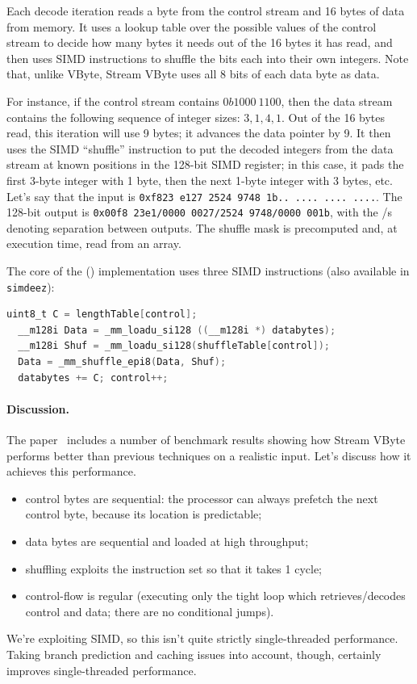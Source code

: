 Each decode iteration reads a byte from the control stream and 16 bytes of data from memory.
It uses a lookup table over the possible values of the control stream to decide how many
bytes it needs out of the 16 bytes it has read, and then uses SIMD instructions to shuffle
the bits each into their own integers. Note that, unlike VByte, Stream VByte uses all 8 bits
of each data byte as data.

For instance, if the control stream contains $0b1000~1100$, then the data stream
contains the following sequence of integer sizes: $3, 1, 4, 1$. Out of the 16 bytes read,
this iteration will use 9 bytes; it advances the data pointer by 9. It then uses the SIMD
``shuffle'' instruction to put the decoded integers from the data stream at known positions in the
128-bit SIMD register; in this case, it pads the first 3-byte integer with 1 byte, then
the next 1-byte integer with 3 bytes, etc. Let's say that the input is
{\tt 0xf823~e127~2524~9748~1b..~....~....~....}. The 128-bit output is
{\tt 0x00f8~23e1/0000~0027/2524 9748/0000~001b}, with the /s denoting separation
between outputs. The shuffle mask is precomputed and, at
execution time, read from an array.

The core of the (\CPP) implementation uses three SIMD instructions (also available in \texttt{simdeez}):
\begin{lstlisting}[language=C]
  uint8_t C = lengthTable[control];
  __m128i Data = _mm_loadu_si128 ((__m128i *) databytes);
  __m128i Shuf = _mm_loadu_si128(shuffleTable[control]);
  Data = _mm_shuffle_epi8(Data, Shuf);
  databytes += C; control++;
\end{lstlisting}

\paragraph{Discussion.} The paper~\cite{LEMIRE20181} includes a number of benchmark results
showing how Stream VByte performs better than previous techniques on a realistic input.
Let's discuss how it achieves this performance.

\begin{itemize}[noitemsep]
\item control bytes are sequential: the processor can always prefetch the next control byte, because
its location is predictable;
\item data bytes are sequential and loaded at high throughput;
\item shuffling exploits the instruction set so that it takes 1 cycle;
\item control-flow is regular (executing only the tight loop which retrieves/decodes control
and data; there are no conditional jumps).
\end{itemize}
We're exploiting SIMD, so this isn't quite strictly single-threaded performance.
Taking branch prediction and caching issues into account, though,
certainly improves single-threaded performance.

